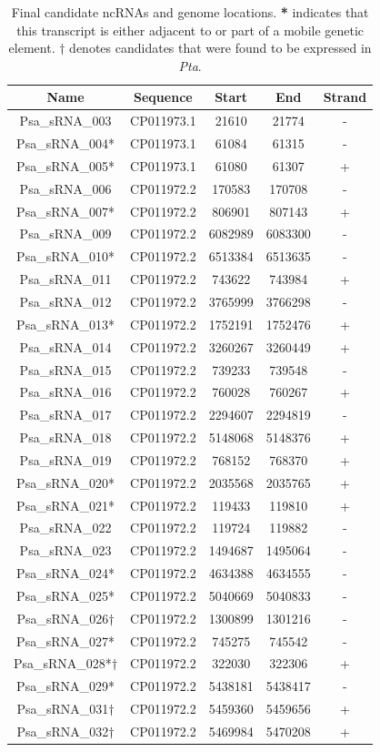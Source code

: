 \begin{table}[H]
    \footnotesize
    \centering
    \begin{tabular}{ccccc}\toprule
Name &  Sequence & Start & End & Strand\\\midrule
Psa_sRNA_003 & CP011973.1 & 21610 & 21774 & -\\
Psa_sRNA_004* & CP011973.1 & 61084 & 61315 & -\\
Psa_sRNA_005* & CP011973.1 & 61080 & 61307 & +\\
Psa_sRNA_006 & CP011972.2 & 170583 & 170708 & -\\
Psa_sRNA_007* & CP011972.2 & 806901 & 807143 & +\\
Psa_sRNA_009 & CP011972.2 & 6082989 & 6083300 & -\\
Psa_sRNA_010* & CP011972.2 & 6513384 & 6513635 & -\\
Psa_sRNA_011 & CP011972.2 & 743622 & 743984 & +\\
Psa_sRNA_012 & CP011972.2 & 3765999 & 3766298 & -\\
Psa_sRNA_013* & CP011972.2 & 1752191 & 1752476 & +\\
Psa_sRNA_014 & CP011972.2 & 3260267 & 3260449 & +\\
Psa_sRNA_015 & CP011972.2 & 739233 & 739548 & -\\
Psa_sRNA_016 & CP011972.2 & 760028 & 760267 & +\\
Psa_sRNA_017 & CP011972.2 & 2294607 & 2294819 & -\\
Psa_sRNA_018 & CP011972.2 & 5148068 & 5148376 & +\\
Psa_sRNA_019 & CP011972.2 & 768152 & 768370 & +\\
Psa_sRNA_020* & CP011972.2 & 2035568 & 2035765 & +\\
Psa_sRNA_021* & CP011972.2 & 119433 & 119810 & +\\
Psa_sRNA_022 & CP011972.2 & 119724 & 119882 & -\\
Psa_sRNA_023 & CP011972.2 & 1494687 & 1495064 & -\\
Psa_sRNA_024* & CP011972.2 & 4634388 & 4634555 & -\\
Psa_sRNA_025* & CP011972.2 & 5040669 & 5040833 & -\\
Psa_sRNA_026$\dagger$ & CP011972.2 & 1300899 & 1301216 & -\\
Psa_sRNA_027* & CP011972.2 & 745275 & 745542 & -\\
Psa_sRNA_028*$\dagger$ & CP011972.2 & 322030 & 322306 & +\\
Psa_sRNA_029* & CP011972.2 & 5438181 & 5438417 & -\\
Psa_sRNA_031$\dagger$ & CP011972.2 & 5459360 & 5459656 & +\\
Psa_sRNA_032$\dagger$ & CP011972.2 & 5469984 & 5470208 & +\\
\bottomrule
    \end{tabular}
    \caption[Genome locations of final candidate ncRNAs]{Final candidate ncRNAs and genome locations. \textbf{*} indicates that this transcript is either adjacent to or part of a mobile genetic element. \textbf{$\dagger$} denotes candidates that were found to be expressed in \textit{Pta}.}
    \label{tab:final_canditates}
\end{table}
